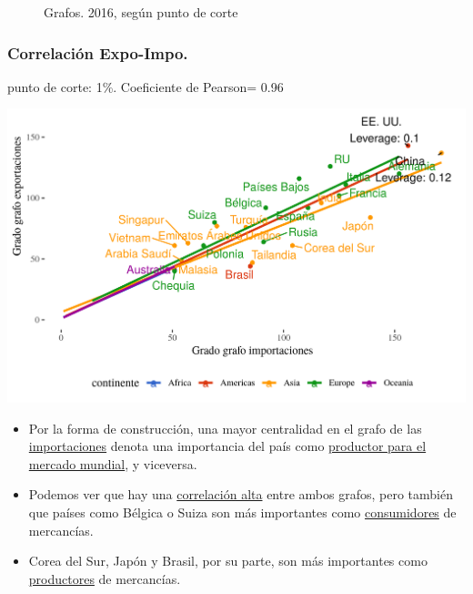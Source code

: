 \documentclass[compress]{beamer}
\begin{document}
\begin{frame}
\begin{figure}
\caption{Grafos. 2016, según punto de corte}
\label{fig:grafo_2016}
\end{figure}

\end{frame}



\begin{frame}


\frametitle{Correlación Expo-Impo.}

punto de corte: 1\%.
Coeficiente de Pearson= 0.96

\includegraphics[width=\linewidth]{Graficos/corr_grados_2016_1_pcnt}

\end{frame}

\begin{frame}

\begin{itemize}
\item[\faRebel] Por la forma de construcción, una mayor centralidad en el grafo de las \underline{importaciones} denota una importancia del país como \underline{productor para el mercado mundial}, y viceversa.
\item[\faRebel] Podemos ver que hay una \underline{correlación alta} entre ambos grafos, pero también que países como Bélgica o Suiza son más importantes como \underline{consumidores} de mercancías.
\item[\faRebel] Corea del Sur, Japón y Brasil, por su parte, son más importantes como \underline{productores} de mercancías. 
\end{itemize}
\end{frame}
\end{document}
